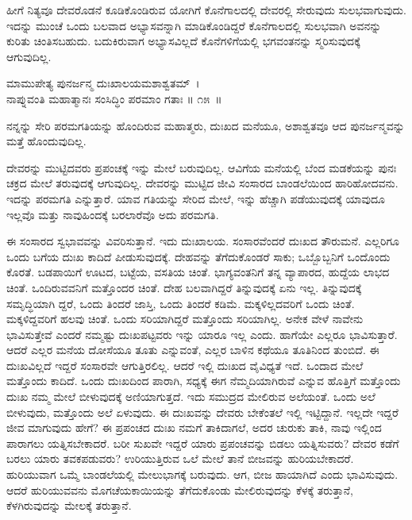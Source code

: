 ಹೀಗೆ ನಿತ್ಯವೂ ದೇವರೊಡನೆ ಕೂಡಿಕೊಂಡಿರುವ ಯೋಗಿಗೆ ಕೊನೆಗಾಲದಲ್ಲಿ ದೇವರಲ್ಲಿ ಸೇರುವುದು ಸುಲಭವಾಗುವುದು. ಇದನ್ನು ಮುಂಚೆ ಒಂದು ಬಲವಾದ ಅಭ್ಯಾಸವನ್ನಾಗಿ ಮಾಡಿಕೊಂಡಿದ್ದರೆ ಕೊನೆಗಾಲದಲ್ಲಿ ಸುಲಭವಾಗಿ ಅವನನ್ನು ಕುರಿತು ಚಿಂತಿಸಬಹುದು. ಬದುಕಿರುವಾಗ ಅಭ್ಯಾಸವಿಲ್ಲದೆ ಕೊನೆಗಳಿಗೆಯಲ್ಲಿ ಭಗವಂತನನ್ನು ಸ್ಮರಿಸುವುದಕ್ಕೆ ಆಗುವುದಿಲ್ಲ.

\begin{shloka}
ಮಾಮುಪೇತ್ಯ ಪುನರ್ಜನ್ಮ ದುಃಖಾಲಯಮಶಾಶ್ವತಮ್~।\\ನಾಪ್ನುವಂತಿ ಮಹಾತ್ಮಾನಃ ಸಂಸಿದ್ಧಿಂ ಪರಮಾಂ ಗತಾಃ \hfill॥ ೧೫~॥
\end{shloka}

\begin{artha}
ನನ್ನನ್ನು ಸೇರಿ ಪರಮಗತಿಯನ್ನು ಹೊಂದಿರುವ ಮಹಾತ್ಮರು, ದುಃಖದ ಮನೆಯೂ, ಅಶಾಶ್ವತವೂ ಆದ ಪುನರ್ಜನ್ಮವನ್ನು ಮತ್ತೆ ಹೊಂದುವುದಿಲ್ಲ.
\end{artha}

ದೇವರನ್ನು ಮುಟ್ಟಿದವರು ಪ್ರಪಂಚಕ್ಕೆ ಇನ್ನು ಮೇಲೆ ಬರುವುದಿಲ್ಲ. ಆವಿಗೆಯ ಮನೆಯಲ್ಲಿ ಬೆಂದ ಮಡಕೆಯನ್ನು ಪುನಃ ಚಕ್ರದ ಮೇಲೆ ತರುವುದಕ್ಕೆ ಆಗುವುದಿಲ್ಲ. ದೇವರನ್ನು ಮುಟ್ಟಿದ ಜೀವಿ ಸಂಸಾರದ ಬಾಂಡಲೆಯಿಂದ ಹಾರಿಹೋದವನು. ಇದನ್ನು ಪರಮಗತಿ ಎನ್ನುತ್ತಾರೆ. ಯಾವ ಗತಿಯನ್ನು ಸೇರಿದ ಮೇಲೆ, ಇನ್ನು ಹೆಚ್ಚಾಗಿ ಪಡೆಯುವುದಕ್ಕೆ ಯಾವುದೂ ಇಲ್ಲವೊ ಮತ್ತು ನಾವು\break ಹಿಂದಕ್ಕೆ ಬರಲಾರೆವೊ ಅದು ಪರಮಗತಿ.

ಈ ಸಂಸಾರದ ಸ್ವಭಾವವನ್ನು ವಿವರಿಸುತ್ತಾನೆ. ಇದು ದುಃಖಾಲಯ. ಸಂಸಾರವೆಂದರೆ ದುಃಖದ ತೌರುಮನೆ. ಎಲ್ಲರಿಗೂ ಒಂದು ಬಗೆಯ ದುಃಖ ಕಾದಿದೆ ಪೀಡುಸುವುದಕ್ಕೆ. ದೇಹವನ್ನು ತೆಗೆದುಕೊಂಡರೆ ಸಾಕು; ಒಬ್ಬೊಬ್ಬನಿಗೆ ಒಂದೊಂದು ಕೊರತೆ. ಬಡಪಾಯಿಗೆ ಊಟದ, ಬಟ್ಟೆಯ, ವಸತಿಯ ಚಿಂತೆ. ಭಾಗ್ಯವಂತನಿಗೆ ತನ್ನ ವ್ಯಾಪಾರದ, ಹುದ್ದೆಯ ಲಾಭದ ಚಿಂತೆ. ಒಂದಿರುವವನಿಗೆ ಮತ್ತೊಂದರ ಚಿಂತೆ. ದೇಹ ಬಲವಾಗಿದ್ದರೆ ತಿನ್ನುವುದಕ್ಕೆ ಏನು ಇಲ್ಲ. ತಿನ್ನುವುದಕ್ಕೆ ಸಮೃದ್ಧಿಯಾಗಿ ದ್ದರೆ, ಒಂದು ತಿಂದರೆ ಜಾಸ್ತಿ, ಒಂದು ತಿಂದರೆ ಕಡಿಮೆ. ಮಕ್ಕಳಿಲ್ಲದವರಿಗೆ ಒಂದು ಚಿಂತೆ. ಮಕ್ಕಳಿದ್ದವರಿಗೆ ಹಲವು ಚಿಂತೆ. ಒಂದು ಸರಿಯಾಗಿದ್ದರೆ ಮತ್ತೊಂದು ಸರಿಯಾಗಿಲ್ಲ. ಅನೇಕ ವೇಳೆ ನಾವೇನು ಭಾವಿಸುತ್ತೇವೆ ಎಂದರೆ ನಮ್ಮಷ್ಟು ದುಃಖಪಟ್ಟವರು ಇನ್ನು ಯಾರೂ ಇಲ್ಲ ಎಂದು. ಹಾಗೆಯೇ ಎಲ್ಲರೂ ಭಾವಿಸುತ್ತಾರೆ. ಆದರೆ ಎಲ್ಲರ ಮನೆಯ ದೋಸೆಯೂ ತೂತು ಎನ್ನುವಂತೆ, ಎಲ್ಲರ ಬಾಳಿನ ಕಥೆಯೂ ತೂತಿನಿಂದ ತುಂಬಿದೆ. ಈ ದುಃಖವಿಲ್ಲದೆ ಇದ್ದರೆ ಸಂಸಾರವೇ ಆಗುತ್ತಿರಲಿಲ್ಲ. ಆದರೆ ಇಲ್ಲಿ ದುಃಖದ ವೈವಿಧ್ಯತೆ ಇದೆ. ಒಂದಾದ ಮೇಲೆ ಮತ್ತೊಂದು ಕಾದಿದೆ. ಒಂದು ದುಃಖದಿಂದ ಪಾರಾಗಿ, ಸಧ್ಯಕ್ಕೆ ಈಗ ನೆಮ್ಮದಿಯಾಗಿರುವೆ ಎನ್ನುವ ಹೊತ್ತಿಗೆ ಮತ್ತೊಂದು ದುಃಖ ನಮ್ಮ ಮೇಲೆ ಬೀಳುವುದಕ್ಕೆ ಅಣಿಯಾಗುತ್ತದೆ. ಇದು ಸಮುದ್ರದ ಮೇಲಿರುವ ಅಲೆಯಂತೆ. ಒಂದು ಅಲೆ ಬೀಳುವುದು, ಮತ್ತೊಂದು ಅಲೆ ಏಳುವುದು. ಈ ದುಃಖವನ್ನು ದೇವರು ಬೇಕೆಂತಲೆ ಇಲ್ಲಿ ಇಟ್ಟಿದ್ದಾನೆ. ಇಲ್ಲದೇ ಇದ್ದರೆ ಜೀವ ಮಾಗುವುದು ಹೇಗೆ? ಈ ಪ್ರಪಂಚದ ದುಃಖ ನಮಗೆ ತಾಕಿದಾಗಲೆ, ಅದರ ಚುರುಕು ತಾಕಿ, ನಾವು ಇಲ್ಲಿಂದ ಪಾರಾಗಲು ಯತ್ನಿಸಬೇಕಾದರೆ. ಬರೀ ಸುಖವೇ ಇದ್ದರೆ ಯಾರು ಪ್ರಪಂಚವನ್ನು ಬಿಡಲು ಯತ್ನಿಸುವರು? ದೇವರ ಕಡೆಗೆ ಬರಲು ಯಾರು ತವಕಪಡುವರು? ಉರಿಯುತ್ತಿರುವ ಒಲೆ ಮೇಲೆ ತಾನೆ ಬೀಜವನ್ನು ಹುರಿಯಬೇಕಾದರೆ. ಹುರಿಯುವಾಗ ಒಮ್ಮೆ ಬಾಂಡಲೆಯಲ್ಲಿ ಮೇಲುಭಾಗಕ್ಕೆ ಬರುವುದು. ಆಗ, ಬೀಜ ಹಾಯಾಗಿದೆ ಎಂದು ಭಾವಿಸುವುದು. ಆದರೆ ಹುರಿಯುವವನು ಮೊಗಚೆಯಕಾಯಿಯನ್ನು ತೆಗೆದುಕೊಂಡು ಮೇಲಿರುವುದನ್ನು ಕೆಳಕ್ಕೆ ತರುತ್ತಾನೆ, ಕೆಳಗಿರುವುದನ್ನು ಮೇಲಕ್ಕೆ ತರುತ್ತಾನೆ.

